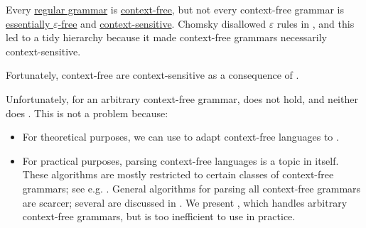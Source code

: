 \begin{remark}\label{rem:chomsky_hierarchy_failure}
  Every \hyperref[def:chomsky_hierarchy/regular]{regular grammar} is \hyperref[def:chomsky_hierarchy/context_free]{context-free}, but not every context-free grammar is \hyperref[def:epsilon_free_grammar]{essentially \( \varepsilon \)-free} and \hyperref[def:chomsky_hierarchy/context_sensitive]{context-sensitive}. Chomsky disallowed \( \varepsilon \) rules in \cite[def. 6]{Chomsky1959}, and this led to a tidy hierarchy because it made context-free grammars necessarily context-sensitive.

  Fortunately, context-free  are context-sensitive as a consequence of .

  Unfortunately, for an arbitrary context-free grammar,  does not hold, and neither does . This is not a problem because:
  \begin{itemize}
    \item For theoretical purposes, we can use  to adapt context-free languages to .

    \item For practical purposes, parsing context-free languages is a topic in itself. These algorithms are mostly restricted to certain classes of context-free grammars; see e.g. \cite[ch. 6]{Salomaa1987}. General algorithms for parsing all context-free grammars are scarcer; several are discussed in \cite{Economopoulos2006}. We present , which handles arbitrary context-free grammars, but is too inefficient to use in practice.
  \end{itemize}
\end{remark}

